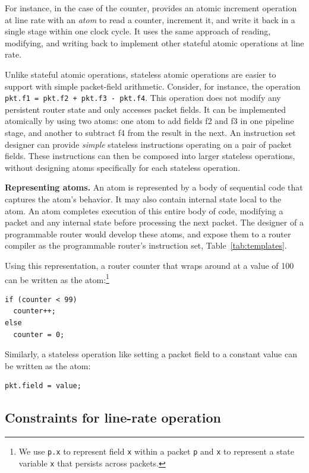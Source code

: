 For instance, in the case of the counter, \absmachine provides an atomic
increment operation at line rate with an {\em atom} to read a counter,
increment it, and write it back in a single stage within one clock cycle. It
uses the same approach of reading, modifying, and writing back to implement
other stateful atomic operations at line rate.

Unlike stateful atomic operations, stateless atomic operations are easier to
support with simple packet-field arithmetic.  Consider, for instance, the
operation {\tt pkt.f1 = pkt.f2 + pkt.f3 - pkt.f4}.  This operation does not
modify any persistent router state and only accesses packet fields. It can be
implemented atomically by using two atoms: one atom to add fields f2 and f3 in
one pipeline stage, and another to subtract f4 from the result in the next. An
instruction set designer can provide {\em simple} stateless instructions
operating on a pair of packet fields. These instructions can then be composed
into larger stateless operations, without designing atoms specifically for each
stateless operation.

\medskip
\noindent
\textbf{Representing atoms.}
An atom is represented by a body of sequential code that captures the atom's
behavior. It may also contain internal state local to the atom. An atom
completes execution of this entire body of code, modifying a packet and any
internal state before processing the next packet. The designer of a
programmable router would develop these atoms, and expose them to a router
compiler as the programmable router's instruction set, \eg
Table~\ref{tab:templates}.

Using this representation, a router counter that wraps around at a
value of 100 can be written as the atom:\footnote{We use {\tt p.x} to
  represent field {\tt x} within a packet {\tt p} and {\tt x} to
  represent a state variable {\tt x} that persists across packets.}
\begin{lstlisting}[style=customc, numbers=none, frame=none]
if (counter < 99)
  counter++;
else
  counter = 0;
\end{lstlisting}

Similarly, a stateless operation like setting a packet field to a constant
value can be written as the atom:
\begin{lstlisting}[style=customc, numbers=none, frame=none]
  pkt.field = value;
\end{lstlisting}

\subsection{Constraints for line-rate operation}
\label{s:atomConstraints}

